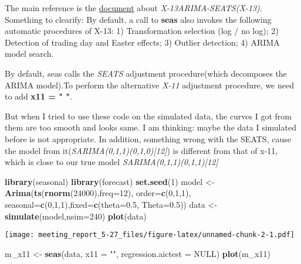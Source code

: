 \documentclass[]{article}
\newenvironment{Shaded}{\begin{snugshade}}{\end{snugshade}}
\newcommand{\DataTypeTok}[1]{\textcolor[rgb]{0.13,0.29,0.53}{#1}}
\newcommand{\DecValTok}[1]{\textcolor[rgb]{0.00,0.00,0.81}{#1}}
\newcommand{\FloatTok}[1]{\textcolor[rgb]{0.00,0.00,0.81}{#1}}
\newcommand{\KeywordTok}[1]{\textcolor[rgb]{0.13,0.29,0.53}{\textbf{#1}}}
\newcommand{\NormalTok}[1]{#1}
\newcommand{\OtherTok}[1]{\textcolor[rgb]{0.56,0.35,0.01}{#1}}
\newcommand{\StringTok}[1]{\textcolor[rgb]{0.31,0.60,0.02}{#1}}
\begin{document}
The main reference is the
\href{https://cran.r-project.org/web/packages/seasonal/vignettes/seas.pdf}{document}
about \emph{X-13ARIMA-SEATS(X-13)}. Something to clearify: By default, a
call to \textbf{seas} also invokes the following automatic procedures of
X-13: 1) Transformation selection (log / no log); 2) Detection of
trading day and Easter effects; 3) Outlier detection; 4) ARIMA model
search.

By default, seas calls the \emph{SEATS} adjustment procedure(which
decomposes the ARIMA model).To perform the alternative \emph{X-11}
adjustment procedure, we need to add \textbf{x11 = " "}.

But when I tried to use these code on the simulated data, the curves I
got from them are too smooth and looks same. I am thinking: maybe the
data I simulated before is not appropriate. In addition, something wrong
with the SEATS, cause the model from
it(\emph{SARIMA(0,1,1)(0,1,0){[}12{]}}) is different from that of x-11,
which is close to our true model \emph{SARIMA(0,1,1)(0,1,1){[}12{]}}

\begin{Shaded}
\begin{Highlighting}[]
\KeywordTok{library}\NormalTok{(seasonal)}
\KeywordTok{library}\NormalTok{(forecast)}
\KeywordTok{set.seed}\NormalTok{(}\DecValTok{1}\NormalTok{)}
\NormalTok{model <-}\StringTok{ }\KeywordTok{Arima}\NormalTok{(}\KeywordTok{ts}\NormalTok{(}\KeywordTok{rnorm}\NormalTok{(}\DecValTok{24000}\NormalTok{),}\DataTypeTok{freq=}\DecValTok{12}\NormalTok{), }\DataTypeTok{order=}\KeywordTok{c}\NormalTok{(}\DecValTok{0}\NormalTok{,}\DecValTok{1}\NormalTok{,}\DecValTok{1}\NormalTok{), }\DataTypeTok{seasonal=}\KeywordTok{c}\NormalTok{(}\DecValTok{0}\NormalTok{,}\DecValTok{1}\NormalTok{,}\DecValTok{1}\NormalTok{),}\DataTypeTok{fixed=}\KeywordTok{c}\NormalTok{(}\DataTypeTok{theta=}\FloatTok{0.5}\NormalTok{, }\DataTypeTok{Theta=}\FloatTok{0.5}\NormalTok{))}
\NormalTok{data <-}\StringTok{ }\KeywordTok{simulate}\NormalTok{(model,}\DataTypeTok{nsim=}\DecValTok{240}\NormalTok{)}
\KeywordTok{plot}\NormalTok{(data)}
\end{Highlighting}
\end{Shaded}

\texttt{[image: meeting\_report\_5-27\_files/figure-latex/unnamed-chunk-2-1.pdf]}

\begin{Shaded}
\begin{Highlighting}[]
\NormalTok{m_x11 <-}\StringTok{ }\KeywordTok{seas}\NormalTok{(data, }\DataTypeTok{x11 =} \StringTok{""}\NormalTok{, }\DataTypeTok{regression.aictest =}  \OtherTok{NULL}\NormalTok{)}
\KeywordTok{plot}\NormalTok{(m_x11)}
\end{Highlighting}
\end{Shaded}
\end{document}
